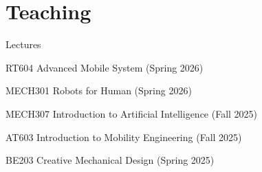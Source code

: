 \documentclass{cv} %
\begin{document}


\section{Teaching}

\begin{pubSubsectionNum}{Lectures}
    \item RT604 Advanced Mobile System (Spring 2026)
    \item MECH301 Robots for Human (Spring 2026)
    \item MECH307 Introduction to Artificial Intelligence (Fall 2025)
    \item AT603 Introduction to Mobility Engineering (Fall 2025)
    \item BE203 Creative Mechanical Design (Spring 2025)
\end{pubSubsectionNum}
\end{document}
